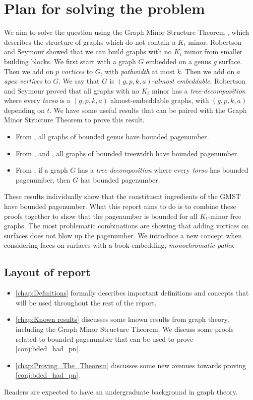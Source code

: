\section{Plan for solving the problem}
We aim to solve the question using the Graph Minor Structure Theorem \cite{robertsonGraphMinorsXVI2003}, which describes the structure of graphs which do not contain a \(K_t\) minor.
Robertson and Seymour showed that we can build graphs with no \(K_t\) minor from smaller building blocks. We first start with a graph \(G\) embedded on a genus \(g\) surface. Then we add on \(p\) \textit{vortices} to \(G\), with \textit{pathwidth} at most \(k\). Then we add on \(a\) \textit{apex vertices} to \(G\). We say that \(G\) is \((g, p, k, a)\)-\textit{almost embeddable}. Robertson and Seymour \cite{robertsonGraphMinorsXVI2003} proved that all graphs with no \(K_t\) minor has a \textit{tree-decomposition} where every \textit{torso} is a \((g, p, k, a)\) almost-embeddable graphs, with \((g, p, k, a)\) depending on \(t\).
We have some useful results that can be paired with the Graph Minor Structure Theorem to prove this result.
\begin{itemize}
	\item From \textcite{heathPagenumberGenusGraphs1992}, all graphs of bounded genus have bounded pagenumber.
	\item From \textcite{ganleyPagenumberTrees2001}, and \textcite{dujmovicGraphTreewidthGeometric2007}, all graphs of bounded treewidth have bounded pagenumber.
	\item From \textcite{hickingbothamStackNumberCliqueSum2023}, if a graph \(G\) has a \textit{tree-decomposition} where every \textit{torso} has bounded pagenumber, then \(G\) has bounded pagenumber.
\end{itemize}
These results individually show that the constituent ingredients of the GMST have bounded pagenumber. What this report aims to do is to combine these proofs together to show that the pagenumber is bounded for all $K_t$-minor free graphs.
The most problematic combinations are showing that adding vortices on surfaces does not blow up the pagenumber. We introduce a new concept when considering faces on surfaces with a book-embedding, \textit{monochromatic paths}. 
\subsection{Layout of report}
\begin{itemize}
	\item \cref{chap:Definitions} formally describes important definitions and concepts that will be used throughout the rest of the report.
	\item \cref{chap:Known results} discusses some known results from graph theory, including the Graph Minor Structure Theorem. We discuss some proofs related to bounded pagenumber that can be used to prove \cref{conj:bded_had_pn}.

	\item \cref{chap:Proving_The_Theorem} discusses some new avenues towards proving \cref{conj:bded_had_pn}.
\end{itemize}
Readers are expected to have an undergraduate background in graph theory.

